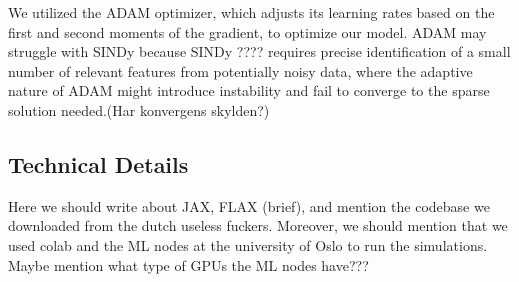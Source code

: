 We utilized the ADAM optimizer, which adjusts its learning rates based on the first and second moments of the gradient, to optimize our model. ADAM may struggle with SINDy because SINDy ???? requires precise identification of a small number of relevant features from potentially noisy data, where the adaptive nature of ADAM might introduce instability and fail to converge to the sparse solution needed.(Har konvergens skylden?)


\subsection{Technical Details}
Here we should write about JAX, FLAX (brief), and mention the codebase we downloaded from the dutch useless fuckers. 
Moreover, we should mention that we used colab and the ML nodes at the university of Oslo to run the simulations. Maybe mention what type of GPUs the ML nodes have???